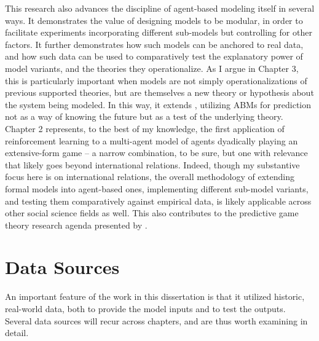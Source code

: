This research also advances the discipline of agent-based modeling itself in several ways. It demonstrates the value of designing models to be modular, in order to facilitate experiments incorporating different sub-models but controlling for other factors. It further demonstrates how such models can be anchored to real data, and how such data can be used to comparatively test the explanatory power of model variants, and the theories they operationalize. As I argue in Chapter 3, this is particularly important when models are not simply operationalizations of previous supported theories, but are themselves a new theory or hypothesis about the system being modeled. In this way, it extends \citet{epstein_2008}, utilizing ABMs for prediction not as a way of knowing the future but as a test of the underlying theory. Chapter 2 represents, to the best of my knowledge, the first application of reinforcement learning to a multi-agent model of agents dyadically playing an extensive-form game -- a narrow combination, to be sure, but one with relevance that likely goes beyond international relations. Indeed, though my substantive focus here is on international relations, the overall methodology of extending formal models into agent-based ones, implementing different sub-model variants, and testing them comparatively against empirical data, is likely applicable across other social science fields as well. This also contributes to the predictive game theory research agenda presented by \citet{fudenberg_2010}.

\section{Data Sources} \label{data-sources}

An important feature of the work in this dissertation is that it utilized historic, real-world data, both to provide the model inputs and to test the outputs. Several data sources will recur across chapters, and are thus worth examining in detail.

